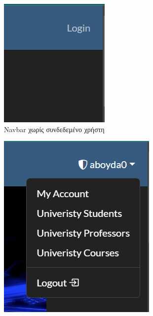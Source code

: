\documentclass[12pt]{article}
\begin{document}
\begin{figure}[H]
	\centering
	\begin{subfigure}{.22\textwidth}
		\centering
		\includegraphics[width=.75\linewidth]{b0.png}
		\caption{Navbar χωρίς συνδεδεμένο χρήστη}
		\label{fig:sub21}
	\end{subfigure}%
	\begin{subfigure}{.22\textwidth}
		\centering
		\includegraphics[width=.8\linewidth]{b1.png}

\end{subfigure}
\end{figure}
\end{document}
